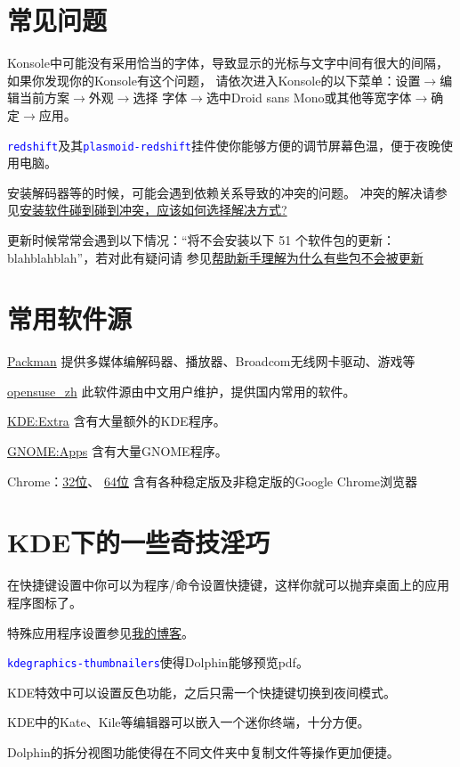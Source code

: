 \documentclass[10pt,openany]{book}
\newcommand{\soft}[1]{\texttt{\textcolor{blue}{#1}}}
\begin{document}
\section{常见问题}
Konsole中可能没有采用恰当的字体，导致显示的光标与文字中间有很大的间隔，如果你发现你的Konsole有这个问题，
请依次进入Konsole的以下菜单：设置$\rightarrow$编辑当前方案$\rightarrow$外观$\rightarrow$选择
字体$\rightarrow$选中Droid sans Mono或其他等宽字体$\rightarrow$确定$\rightarrow$应用。

\soft{redshift}及其\soft{plasmoid-redshift}挂件使你能够方便的调节屏幕色温，便于夜晚使用电脑。

安装解码器等的时候，可能会遇到依赖关系导致的冲突的问题。
冲突的解决请参见\href{https://forum.suse.org.cn/viewtopic.php?t=2867&p=22491#p22491}{安装软件碰到碰到冲突，应该如何选择解决方式?}

更新时候常常会遇到以下情况：“将不会安装以下 51 个软件包的更新：blahblahblah”，若对此有疑问请
参见\href{https://forum.suse.org.cn/viewtopic.php?t=2777&p=21896}{帮助新手理解为什么有些包不会被更新}
\section{常用软件源}\label{repo}


\begin{compactdesc}
 \item[\href{http://mirrors.hust.edu.cn/packman/suse/openSUSE_13.1/}{Packman}]
 提供多媒体编解码器、播放器、Broadcom无线网卡驱动、游戏等
 \item[\href{http://download.opensuse.org/repositories/home:/opensuse_zh/openSUSE_13.1/}{opensuse\_zh}]
 此软件源由中文用户维护，提供国内常用的软件。
 \item[\href{http://download.opensuse.org/repositories/KDE:/Extra/openSUSE_13.1/}{KDE:Extra}]
 含有大量额外的KDE程序。
 \item[\href{http://download.opensuse.org/repositories/GNOME:/Apps/openSUSE_13.1/}{GNOME:Apps}]
 含有大量GNOME程序。
 \item[Chrome：\href{http://dl.google.com/linux/chrome/rpm/stable/i386}{32位}、 \href{http://dl.google.com/linux/chrome/rpm/stable/x86_64}{64位}] 含有各种稳定版及非稳定版的Google Chrome浏览器
\end{compactdesc}
\section{KDE下的一些奇技淫巧}
在快捷键设置中你可以为程序/命令设置快捷键，这样你就可以抛弃桌面上的应用程序图标了。

特殊应用程序设置参见\href{https://zpj.blog.ustc.edu.cn/?p=304}{我的博客}。

\soft{kdegraphics-thumbnailers}使得Dolphin能够预览pdf。

KDE特效中可以设置反色功能，之后只需一个快捷键切换到夜间模式。

KDE中的Kate、Kile等编辑器可以嵌入一个迷你终端，十分方便。

Dolphin的拆分视图功能使得在不同文件夹中复制文件等操作更加便捷。
\end{document}
